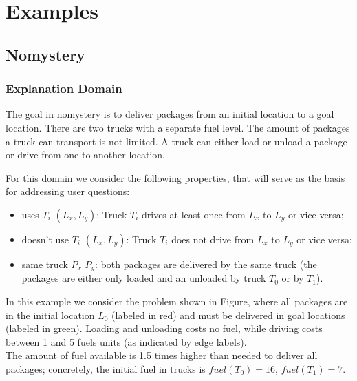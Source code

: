 \section{Examples}

\subsection{Nomystery}

\subsubsection*{Explanation Domain}
The goal in nomystery is to deliver packages from an initial location 
to a goal location. There are two trucks with a separate fuel level.
The amount of packages a truck can transport is not limited. A truck can either load or 
unload a package or drive from one to another location. 

For this domain we consider the following properties, that will serve as the basis for addressing user questions:

\begin{itemize}
	\item uses $T_i$ $(L_x,L_y)$: Truck $T_i$ drives at least once from $L_x$ to
		$L_y$ or vice versa;
	\item doesn't use $T_i$ $(L_x,L_y)$: Truck $T_i$ does not drive from $L_x$ to
		$L_y$ or vice versa;
	\item same truck $P_x$ $P_y$: both packages are delivered by the same truck
		(the packages are either only loaded and an unloaded by truck $T_0$ or by $T_1$).
\end{itemize}

In this example we consider the problem shown in Figure, where all packages are in the initial location $L_0$ (labeled in red) and must be delivered in goal locations (labeled in green). 
Loading and unloading costs no fuel, while driving costs between 1 and 5 fuels units (as indicated by edge labels).\\
The amount of fuel available is 1.5 times higher than needed to deliver all packages; concretely, the initial fuel in trucks is $fuel(T_0) = 16$, $fuel(T_1) = 7$.


